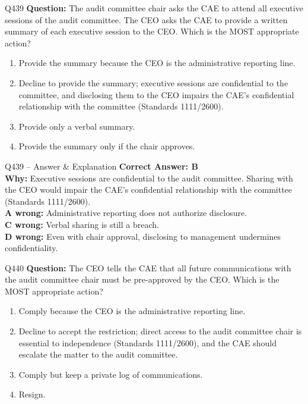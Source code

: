 \documentclass[aspectratio=169,10pt]{beamer}
\begin{document}
	\begin{frame}[t]{Q439}
		\small
		\textbf{Question:} The audit committee chair asks the CAE to attend all executive sessions of the audit committee. The CEO asks the CAE to provide a written summary of each executive session to the CEO. Which is the MOST appropriate action?
		\begin{enumerate}[label=\Alph*.,itemsep=1pt,topsep=2pt]
			\item Provide the summary because the CEO is the administrative reporting line.
			\item Decline to provide the summary; executive sessions are confidential to the committee, and disclosing them to the CEO impairs the CAE's confidential relationship with the committee (Standards 1111/2600).
			\item Provide only a verbal summary.
			\item Provide the summary only if the chair approves.
		\end{enumerate}
	\end{frame}
	
	\begin{frame}[t]{Q439 -- Answer \& Explanation}
		\small
		\textbf{Correct Answer: B} \\[4pt]
		\textbf{Why:} Executive sessions are confidential to the audit committee. Sharing with the CEO would impair the CAE's confidential relationship with the committee (Standards 1111/2600). \\[4pt]
		\textbf{A wrong:} Administrative reporting does not authorize disclosure. \\[2pt]
		\textbf{C wrong:} Verbal sharing is still a breach. \\[2pt]
		\textbf{D wrong:} Even with chair approval, disclosing to management undermines confidentiality.
	\end{frame}
	
	\begin{frame}[t]{Q440}
		\small
		\textbf{Question:} The CEO tells the CAE that all future communications with the audit committee chair must be pre-approved by the CEO. Which is the MOST appropriate action?
		\begin{enumerate}[label=\Alph*.,itemsep=1pt,topsep=2pt]
			\item Comply because the CEO is the administrative reporting line.
			\item Decline to accept the restriction; direct access to the audit committee chair is essential to independence (Standards 1111/2600), and the CAE should escalate the matter to the audit committee.
			\item Comply but keep a private log of communications.
			\item Resign.
		\end{enumerate}
	\end{frame}
	
\end{document}
